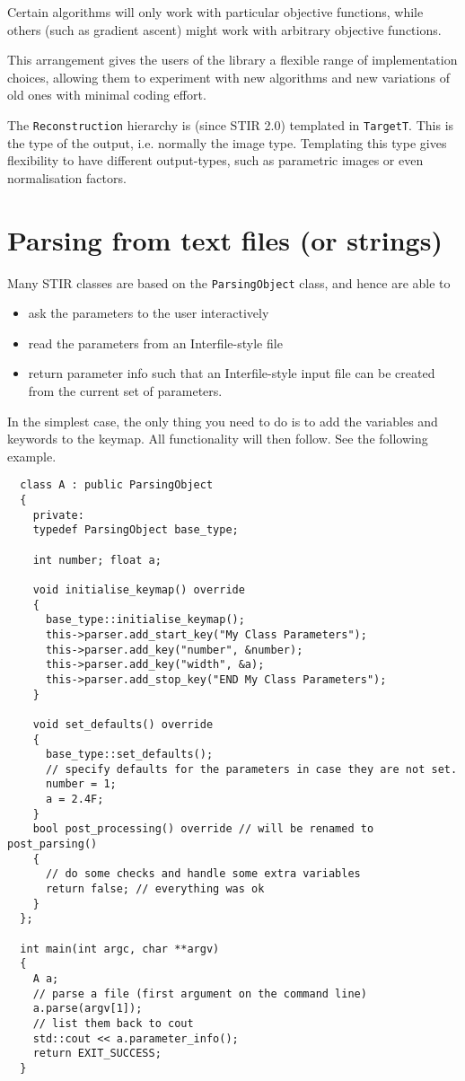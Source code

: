 \documentclass{article}
\begin{document}
Certain algorithms will only work with particular objective functions,
while others (such as gradient ascent) might work with arbitrary
objective functions.

This arrangement gives the users 
of the library a flexible range of implementation choices, allowing 
them to experiment with new algorithms and new variations of 
old ones with minimal coding effort.

The \texttt{Reconstruction} hierarchy is (since STIR 2.0) templated in 
\texttt{TargetT}. This is the type of the output, i.e. normally
the image type. Templating this type gives flexibility to have
different output-types, such as parametric images or even 
normalisation factors.

\section{
Parsing from text files (or strings)\label{sect:parsing}}
Many STIR classes are based on the \texttt{ParsingObject} class, and hence 
are able to
\begin{itemize}
\item 
ask the parameters to the user interactively
\item 
read the parameters from an Interfile-style file
\item 
return parameter info such that an Interfile-style input file 
can be created from the current set of parameters.
\end{itemize}

In the simplest case, the only thing you need to do is to add the variables
and keywords to the keymap. All functionality will then follow. See the
following example.

\begin{verbatim}
  class A : public ParsingObject
  {
    private:
    typedef ParsingObject base_type;

    int number; float a;

    void initialise_keymap() override
    {
      base_type::initialise_keymap();
      this->parser.add_start_key("My Class Parameters");
      this->parser.add_key("number", &number);
      this->parser.add_key("width", &a);
      this->parser.add_stop_key("END My Class Parameters");
    }

    void set_defaults() override
    {
      base_type::set_defaults();
      // specify defaults for the parameters in case they are not set.
      number = 1;
      a = 2.4F;
    }
    bool post_processing() override // will be renamed to post_parsing()
    {
      // do some checks and handle some extra variables
      return false; // everything was ok
    }
  };

  int main(int argc, char **argv)
  {
    A a;
    // parse a file (first argument on the command line)
    a.parse(argv[1]);
    // list them back to cout
    std::cout << a.parameter_info();
    return EXIT_SUCCESS;
  }
\end{verbatim}
\end{document}
